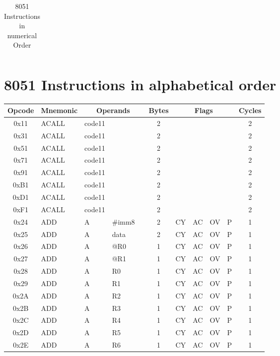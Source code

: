\documentclass[a4paper,twoside,12pt]{book}
\newcommand{\mysmallfont}{\fontsize{8pt}{10pt} \selectfont{}}
\begin{document}
{\begin{longtable}{|c|l|lll|c|llll|c|}
		\caption{8051 Instructions in numerical Order}
	\end{longtable}
	}

\chapter{8051 Instructions in alphabetical order}
	{
	\mysmallfont{}
	\begin{longtable}{|c|l|lll|c|llll|c|}
		\hline
			\textbf{Opcode} &
			\textbf{Mnemonic} &
			\multicolumn{3}{c|}{\textbf{Operands}} &
			\textbf{Bytes} &
			\multicolumn{4}{c|}{\textbf{Flags}} &
			\textbf{Cycles}	\\\hline
		\endhead

		0x11	& ACALL	& code11&	&	& 2	&	&	&	&	& 2	\\\hline
		0x31	& ACALL	& code11&	&	& 2	&	&	&	&	& 2	\\\hline
		0x51	& ACALL	& code11&	&	& 2	&	&	&	&	& 2	\\\hline
		0x71	& ACALL	& code11&	&	& 2	&	&	&	&	& 2	\\\hline
		0x91	& ACALL	& code11&	&	& 2	&	&	&	&	& 2	\\\hline
		0xB1	& ACALL	& code11&	&	& 2	&	&	&	&	& 2	\\\hline
		0xD1	& ACALL	& code11&	&	& 2	&	&	&	&	& 2	\\\hline
		0xF1	& ACALL	& code11&	&	& 2	&	&	&	&	& 2	\\\hline
		0x24	& ADD	& A	& \#imm8&	& 2	& CY	& AC	& OV	& P	& 1	\\\hline
		0x25	& ADD	& A	& data	&	& 2	& CY	& AC	& OV	& P	& 1	\\\hline
		0x26	& ADD	& A	& @R0	&	& 1	& CY	& AC	& OV	& P	& 1	\\\hline
		0x27	& ADD	& A	& @R1	&	& 1	& CY	& AC	& OV	& P	& 1	\\\hline
		0x28	& ADD	& A	& R0	&	& 1	& CY	& AC	& OV	& P	& 1	\\\hline
		0x29	& ADD	& A	& R1	&	& 1	& CY	& AC	& OV	& P	& 1	\\\hline
		0x2A	& ADD	& A	& R2	&	& 1	& CY	& AC	& OV	& P	& 1	\\\hline
		0x2B	& ADD	& A	& R3	&	& 1	& CY	& AC	& OV	& P	& 1	\\\hline
		0x2C	& ADD	& A	& R4	&	& 1	& CY	& AC	& OV	& P	& 1	\\\hline
		0x2D	& ADD	& A	& R5	&	& 1	& CY	& AC	& OV	& P	& 1	\\\hline
		0x2E	& ADD	& A	& R6	&	& 1	& CY	& AC	& OV	& P	& 1	\\\hline

\end{longtable}}
\end{document}
